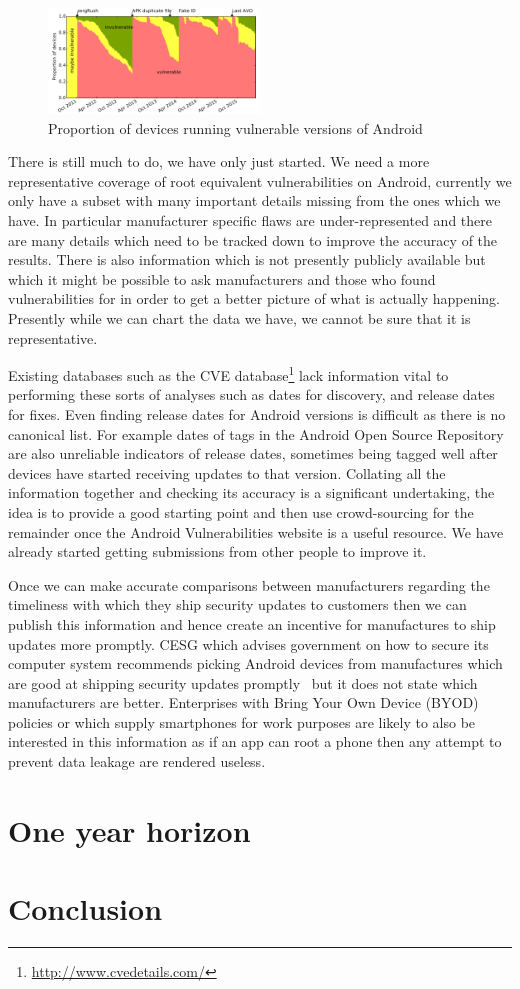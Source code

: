 \documentclass[a4paper,twocolumn]{article}
\begin{document}
\begin{figure}
 \includegraphics[width=0.5\textwidth]{figures/proportioninsecure.pdf}
 \caption{Proportion of devices running vulnerable versions of Android}
 \label{fig:propinsecure}
\end{figure}

There is still much to do, we have only just started.
We need a more representative coverage of root equivalent vulnerabilities on Android, currently we only have a subset with many important details missing from the ones which we have.
In particular manufacturer specific flaws are under-represented and there are many details which need to be tracked down to improve the accuracy of the results.
There is also information which is not presently publicly available but which it might be possible to ask manufacturers and those who found vulnerabilities for in order to get a better picture of what is actually happening.
Presently while we can chart the data we have, we cannot be sure that it is representative.

Existing databases such as the CVE database\footnote{\url{http://www.cvedetails.com/}} lack information vital to performing these sorts of analyses such as dates for discovery, and release dates for fixes.
Even finding release dates for Android versions is difficult as there is no canonical list.
For example dates of tags in the Android Open Source Repository are also unreliable indicators of release dates, sometimes being tagged well after devices have started receiving updates to that version.
Collating all the information together and checking its accuracy is a significant undertaking, the idea is to provide a good starting point and then use crowd-sourcing for the remainder once the Android Vulnerabilities website is a useful resource.
We have already started getting submissions from other people to improve it.

Once we can make accurate comparisons between manufacturers regarding the timeliness with which they ship security updates to customers then we can publish this information and hence create an incentive for manufactures to ship updates more promptly.
CESG which advises government on how to secure its computer system recommends picking Android devices from manufactures which are good at shipping security updates promptly~\cite{TODO} but it does not state which manufacturers are better.
Enterprises with Bring Your Own Device (BYOD) policies or which supply smartphones for work purposes are likely to also be interested in this information as if an app can root a phone then any attempt to prevent data leakage are rendered useless.

\section*{One year horizon}

\section*{Conclusion}

\printbibliography
\end{document}

